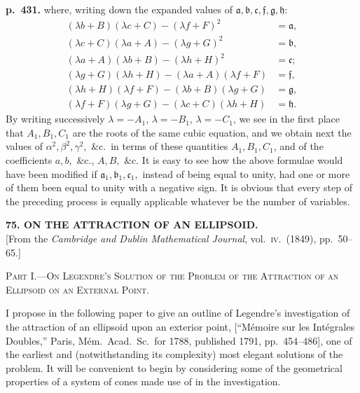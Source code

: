 \documentclass[11pt]{article}
\begin{document}
\noindent\textbf{p.~431.} where, writing down the expanded values of $\mathfrak{a},\mathfrak{b},\mathfrak{c},\mathfrak{f},\mathfrak{g},\mathfrak{h}$:
\[
\begin{aligned}
(\lambda b + B)(\lambda c + C) - (\lambda f + F)^2 &= \mathfrak{a},\\
(\lambda c + C)(\lambda a + A) - (\lambda g + G)^2 &= \mathfrak{b},\\
(\lambda a + A)(\lambda b + B) - (\lambda h + H)^2 &= \mathfrak{c};\\
(\lambda g + G)(\lambda h + H) - (\lambda a + A)(\lambda f + F) &= \mathfrak{f},\\
(\lambda h + H)(\lambda f + F) - (\lambda b + B)(\lambda g + G) &= \mathfrak{g},\\
(\lambda f + F)(\lambda g + G) - (\lambda c + C)(\lambda h + H) &= \mathfrak{h}.
\end{aligned}
\]
By writing successively $\lambda = -A_1$, $\lambda = -B_1$, $\lambda = -C_1$, we see in the first place that $A_1, B_1, C_1$ are the roots of the same cubic equation, and we obtain next the values of $\alpha^2, \beta^2, \gamma^2,$ \&c.\ in terms of these quantities $A_1, B_1, C_1$, and of the coefficients $a,b,$ \&c., $A, B,$ \&c. It is easy to see how the above formulae would have been modified if $\mathfrak{a}_1, \mathfrak{b}_1, \mathfrak{c}_1,$ instead of being equal to unity, had one or more of them been equal to unity with a negative sign. It is obvious that every step of the preceding process is equally applicable whatever be the number of variables.

\bigskip
\begin{center}
\textbf{75. ON THE ATTRACTION OF AN ELLIPSOID.}\\[2pt]
[From the \textit{Cambridge and Dublin Mathematical Journal}, vol.~\textsc{iv}.\ (1849), pp.~50--65.]
\end{center}

\begin{center}
\textsc{Part I.---On Legendre's Solution of the Problem of the Attraction of an Ellipsoid on an External Point.}
\end{center}

I propose in the following paper to give an outline of Legendre's investigation of the attraction of an ellipsoid upon an exterior point, [``M\'emoire sur les Int\'egrales Doubles,'' Paris, M\'em.\ Acad.\ Sc.\ for 1788, published 1791, pp.~454--486], one of the earliest and (notwithstanding its complexity) most elegant solutions of the problem. It will be convenient to begin by considering some of the geometrical properties of a system of cones made use of in the investigation.
\end{document}
